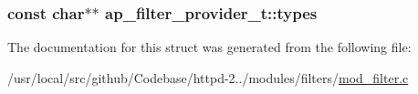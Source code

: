 \subsubsection[{\texorpdfstring{types}{types}}]{\setlength{\rightskip}{0pt plus 5cm}const char$\ast$$\ast$ ap\+\_\+filter\+\_\+provider\+\_\+t\+::types}\hypertarget{structap__filter__provider__t_a0c4f4d740896e2f9bb7cd25159b1ed6f}{}\label{structap__filter__provider__t_a0c4f4d740896e2f9bb7cd25159b1ed6f}


The documentation for this struct was generated from the following file\+:\begin{DoxyCompactItemize}
\item 
/usr/local/src/github/\+Codebase/httpd-\/2../modules/filters/\hyperlink{mod__filter_8c}{mod\+\_\+filter.\+c}\end{DoxyCompactItemize}
